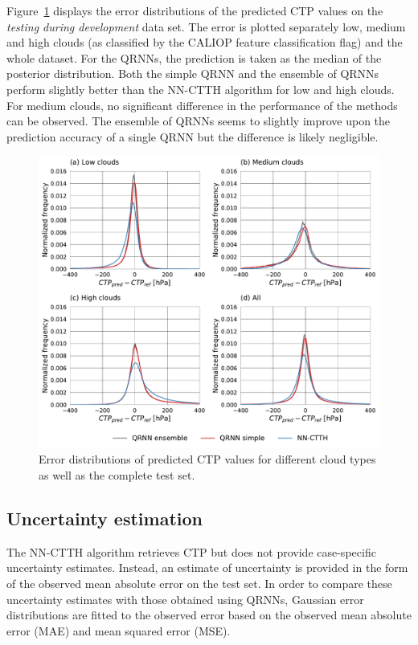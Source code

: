 \documentclass[journal abbreviation, manuscript]{copernicus}
\begin{document}
Figure~\ref{fig:ctp_results} displays the error distributions of the predicted
CTP values on the \textit{testing during development} data set. The error is
plotted separately low, medium and high clouds (as classified by the CALIOP
feature classification flag) and the whole dataset. For the QRNNs, the
prediction is taken as the median of the posterior distribution. Both the simple
QRNN and the ensemble of QRNNs perform slightly better than the NN-CTTH
algorithm for low and high clouds. For medium clouds, no significant difference
in the performance of the methods can be observed. The ensemble of QRNNs seems
to slightly improve upon the prediction accuracy of a single QRNN but the
difference is likely negligible.

\begin{figure}[hbpt!]
  \centering
  \includegraphics[width = 1.0\linewidth]{../plots/ctp_results}
  \caption{Error distributions of predicted CTP values for different cloud
    types as well as the complete test set.}
  \label{fig:ctp_results}
\end{figure}

\subsection{Uncertainty estimation}

The NN-CTTH algorithm retrieves CTP but does not provide case-specific
uncertainty estimates. Instead, an estimate of uncertainty is provided in the
form of the observed mean absolute error on the test set. In order to compare
these uncertainty estimates with those obtained using QRNNs, Gaussian error
distributions are fitted to the observed error based on the observed mean
absolute error (MAE) and mean squared error (MSE).
\end{document}
